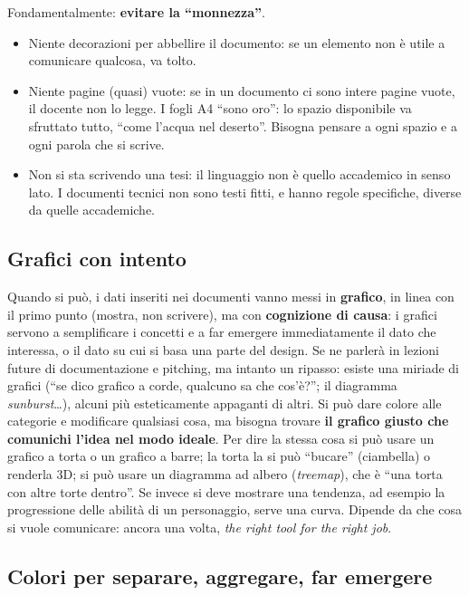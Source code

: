 Fondamentalmente: \textbf{evitare la ``monnezza''}.
\begin{itemize}
  \item Niente decorazioni per abbellire il documento: se un elemento non è
        utile a comunicare qualcosa, va tolto.
  \item Niente pagine (quasi) vuote: se in un documento ci sono intere pagine
        vuote, il docente non lo legge. I fogli A4 ``sono oro'': lo spazio
        disponibile va sfruttato tutto, ``come l'acqua nel deserto''.
        Bisogna pensare a ogni spazio e a ogni parola che si scrive.
  \item Non si sta scrivendo una tesi: il linguaggio non è quello accademico
        in senso lato. I documenti tecnici non sono testi fitti, e hanno regole
        specifiche, diverse da quelle accademiche.
\end{itemize}

\subsection{Grafici con intento}

Quando si può, i dati inseriti nei documenti vanno messi in \textbf{grafico},
in linea con il primo punto (mostra, non scrivere), ma con \textbf{cognizione
di causa}: i grafici servono a semplificare i concetti e a far emergere
immediatamente il dato che interessa, o il dato su cui si basa una parte del
design. Se ne parlerà in lezioni future di documentazione e pitching, ma
intanto un ripasso: esiste una miriade di grafici (``se dico grafico a corde,
qualcuno sa che cos'è?''; il diagramma \emph{sunburst}\dots), alcuni più
esteticamente appaganti di altri. Si può dare colore alle categorie e
modificare qualsiasi cosa, ma bisogna trovare \textbf{il grafico giusto che
comunichi l'idea nel modo ideale}. Per dire la stessa cosa si può usare un
grafico a torta o un grafico a barre; la torta la si può ``bucare'' (ciambella)
o renderla 3D; si può usare un diagramma ad albero (\emph{treemap}), che è
``una torta con altre torte dentro''. Se invece si deve mostrare una
tendenza, ad esempio la progressione delle abilità di un personaggio, serve
una curva. Dipende da che cosa si vuole comunicare: ancora una volta,
\emph{the right tool for the right job}.

\subsection{Colori per separare, aggregare, far emergere}

